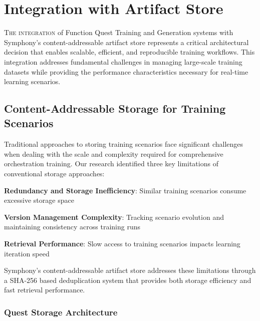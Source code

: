 
\section*{Integration with Artifact Store}

\lettrine{T}{he integration} of Function Quest Training and Generation systems with Symphony's content-addressable artifact store represents a critical architectural decision that enables scalable, efficient, and reproducible training workflows. This integration addresses fundamental challenges in managing large-scale training datasets while providing the performance characteristics necessary for real-time learning scenarios.

\subsection*{Content-Addressable Storage for Training Scenarios}

Traditional approaches to storing training scenarios face significant challenges when dealing with the scale and complexity required for comprehensive orchestration training. Our research identified three key limitations of conventional storage approaches:

\begin{expandedlist}
    \item \textbf{Redundancy and Storage Inefficiency}: Similar training scenarios consume excessive storage space
    \item \textbf{Version Management Complexity}: Tracking scenario evolution and maintaining consistency across training runs
    \item \textbf{Retrieval Performance}: Slow access to training scenarios impacts learning iteration speed
\end{expandedlist}

Symphony's content-addressable artifact store addresses these limitations through a SHA-256 based deduplication system that provides both storage efficiency and fast retrieval performance.

\subsubsection*{Quest Storage Architecture}

